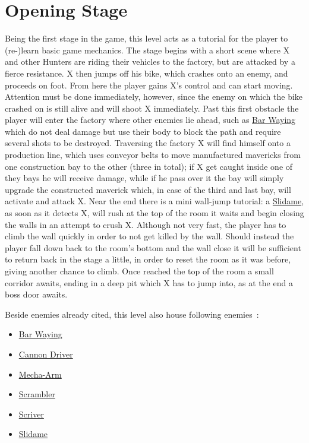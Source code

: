 \section{Opening Stage}
Being the first stage in the game, this level acts as a tutorial for the player to (re-)learn basic game mechanics. The stage begins with a short scene where X and other Hunters are riding their vehicles to the factory, but are attacked by a fierce resistance. X then jumps off his bike, which crashes onto an enemy, and proceeds on foot. From here the player gains X's control and can start moving. Attention must be done immediately, however, since the enemy on which the bike crashed on is still alive and will shoot X immediately. Past this first obstacle the player will enter the factory where other enemies lie ahead, such as \hyperlink{enem:Bar_Waying}{Bar Waying} which do not deal damage but use their body to block the path and require several shots to be destroyed. Traversing the factory X will find himself onto a production line, which uses conveyor belts to move manufactured mavericks from one construction bay to the other (three in total); if X get caught inside one of they bays he will receive damage, while if he pass over it the bay will simply upgrade the constructed maverick which, in case of the third and last bay, will activate and attack X. Near the end there is a mini wall-jump tutorial: a \hyperlink{enem:Slidame}{Slidame}, as soon as it detects X, will rush at the top of the room it waits and begin closing the walls in an attempt to crush X. Although not very fast, the player has to climb the wall quickly in  order to not get killed by the wall. Should instead the player fall down back to the room's bottom and the wall close it will be sufficient to return back in the stage a little, in order to reset the room as it was before, giving another chance to climb. Once reached the top of the room a small corridor awaits, ending in a deep pit which X has to jump into, as at the end a boss door awaits.

Beside enemies already cited, this level also house following enemies~\cite{wiki:X2_opening}:
\begin{itemize}
	\item \hyperlink{enem:Bar_Waying}{Bar Waying}
	\item \hyperlink{enem:Cannon_Driver}{Cannon Driver}
	\item \hyperlink{enem:Mecha-Arm}{Mecha-Arm}
	\item \hyperlink{enem:Scrambler}{Scrambler}
	\item \hyperlink{enem:Scriver}{Scriver}
	\item \hyperlink{enem:Slidame}{Slidame}
\end{itemize}

